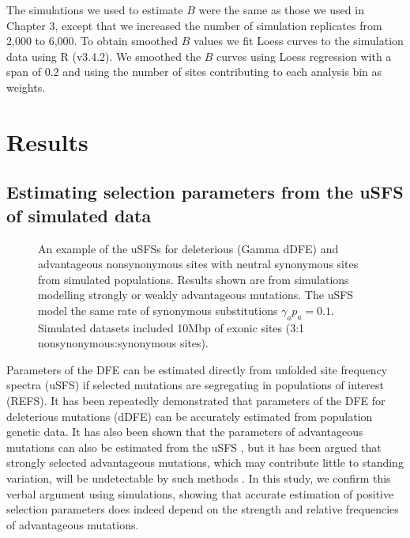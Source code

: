  	The simulations we used to estimate $B$ were the same as those we used in Chapter 3, except that we increased the number of simulation replicates from 2,000 to 6,000. To obtain smoothed $B$ values we fit Loess curves to the simulation data using R (v3.4.2). We smoothed the $B$ curves using Loess regression with a span of 0.2 and using the number of sites contributing to each analysis bin as weights.

%
%

\section*{Results}
%
\subsection*{Estimating selection parameters from the uSFS of simulated data}

\linespread{1}

\begin{figure}[h]
   \centering      
   \noindent{}
 \caption{An example of the uSFSs for deleterious (Gamma dDFE) and advantageous nonsynonymous sites with neutral synonymous sites from simulated populations. Results shown are from simulations modelling strongly or weakly advantageous mutations. The uSFS  model the same rate of synonymous substitutions $\gamma_a p_a = 0.1$. Simulated datasets included 10Mbp of exonic sites (3:1 nonsynonymous:synonymous sites).}
 
 \label{fig:sfsExample}
\end{figure}
\linespread{1}

	Parameters of the DFE can be estimated directly from unfolded site frequency spectra (uSFS) if selected mutations are segregating in populations of interest (REFS). It has been repeatedly demonstrated that parameters of the DFE for deleterious mutations (dDFE) can be accurately estimated from population genetic data. It has also been shown that the parameters of advantageous mutations can also be estimated from the uSFS \citep{RN210, RN354}, but it has been argued that strongly selected advantageous mutations, which may contribute little to standing variation, will be undetectable by such methods \citep{RN323}. In this study, we confirm this verbal argument using simulations, showing that accurate estimation of positive selection parameters does indeed depend on the strength and relative frequencies of advantageous mutations.

